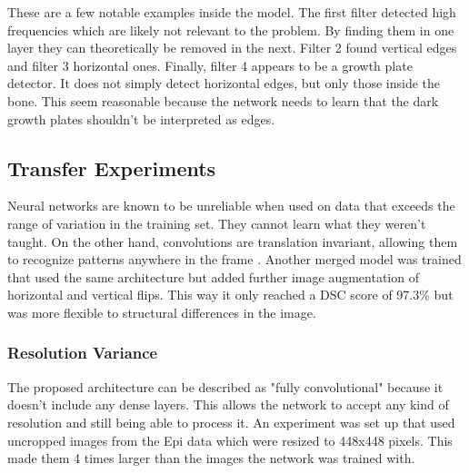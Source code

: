 These are a few notable examples inside the model. The first filter detected high frequencies which are likely not relevant to the problem. By finding them in one layer they can theoretically be removed in the next. Filter 2 found vertical edges and filter 3 horizontal ones. Finally, filter 4 appears to be a growth plate detector. It does not simply detect horizontal edges, but only those inside the bone. This seem reasonable because the network needs to learn that the dark growth plates shouldn't be interpreted as edges.


\subsection{Transfer Experiments}

Neural networks are known to be unreliable when used on data that exceeds the range of variation in the training set. They cannot learn what they weren't taught. On the other hand, convolutions are translation invariant, allowing them to recognize patterns anywhere in the frame \cite{Chollet2017}. Another merged model was trained that used the same architecture but added further image augmentation of horizontal and vertical flips. This way it only reached a DSC score of 97.3\% but was more flexible to structural differences in the image.

\subsubsection{Resolution Variance}

The proposed architecture can be described as "fully convolutional" because it doesn't include any dense layers. This allows the network to accept any kind of resolution and still being able to process it. An experiment was set up that used uncropped images from the Epi data which were resized to 448x448 pixels. This made them 4 times larger than the images the network was trained with.

